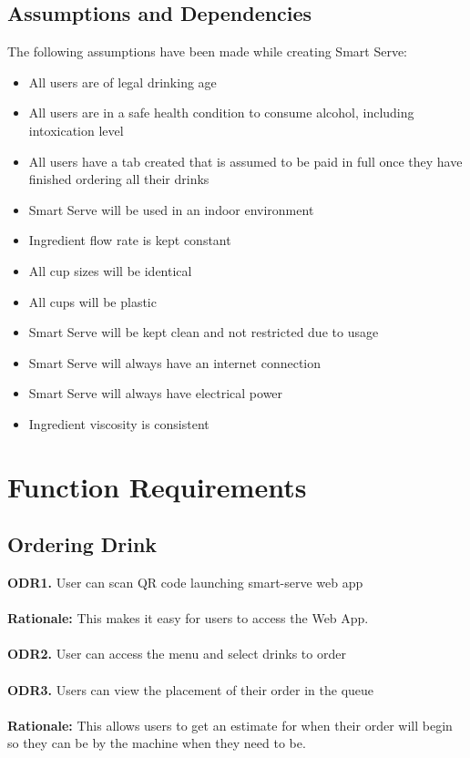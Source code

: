 \documentclass{article}
\begin{document}
\subsection{Assumptions and Dependencies} %
    The following assumptions have been made while creating Smart Serve:
    \begin{itemize}
        \item All users are of legal drinking age
        \item All users are in a safe health condition to consume alcohol, including intoxication level
        \item All users have a tab created that is assumed to be paid in full once they have finished ordering all their drinks
        \item Smart Serve will be used in an indoor environment
        \item Ingredient flow rate is kept constant
        \item All cup sizes will be identical
        \item All cups will be plastic
        \item Smart Serve will be kept clean and not restricted due to usage
        \item Smart Serve will always have an internet connection
        \item Smart Serve will always have electrical power
        \item Ingredient viscosity is consistent
    \end{itemize}

\section{Function Requirements}
\subsection{Ordering Drink}
    \noindent\textbf{ODR1.} User can scan QR code launching smart-serve web app \\\\
    \textbf{Rationale:} This makes it easy for users to access the Web App.\\\\
    
    \textbf{ODR2.} User can access the menu and select drinks to order\\\\
    
    \textbf{ODR3.} Users can view the placement of their order in the queue \\\\
    \textbf{Rationale:} This allows users to get an estimate for when their order will begin so they can be by the machine when they need to be.\\\\
    
\end{document}
